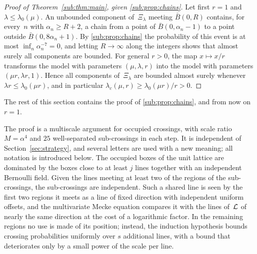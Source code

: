\documentclass[11pt,letterpaper]{article}
\begin{document}
\begin{proof}[Proof of Theorem~\ref{sub:thm:main}, given \cref{sub:prop:chains}]
Let first $r=1$ and $\lambda\le\lambda_0(\mu)$. An unbounded component of~$\Xi_\lambda$ meeting $\bar B(0,R)$ contains, for every~$n$ with $\alpha_n\ge R+2$, a chain from a point of $\bar B(0,\alpha_n-1)$ to a point outside $\bar B(0,8\alpha_n+1)$. By \cref{sub:prop:chains} the probability of this event is at most $\inf_n\alpha_n^{-7}=0$, and letting $R\to\infty$ along the integers shows that almost surely all components are bounded. For general $r>0$, the map $x\mapsto x/r$ transforms the model with parameters $(\mu,\lambda,r)$ into the model with parameters $(\mu r,\lambda r,1)$. Hence all components of~$\Xi_\lambda$ are bounded almost surely whenever $\lambda r\le\lambda_0(\mu r)$, and in particular $\lambda_c(\mu,r)\ge\lambda_0(\mu r)/r>0$.
\end{proof}

The rest of this section contains the proof of \cref{sub:prop:chains}, and from now on $r=1$.

The proof is a multiscale argument for occupied crossings, with scale ratio $M=\alpha^{4}$ and $25$ well-separated sub-crossings in each step. It is independent of Section~\ref{sec:strategy}, and several letters are used with a new meaning; all notation is introduced below. The occupied boxes of the unit lattice are dominated by the boxes close to at least $j$ lines together with an independent Bernoulli field. Given the lines meeting at least two of the regions of the sub-crossings, the sub-crossings are independent. Such a shared line is seen by the first two regions it meets as a line of fixed direction with independent uniform offsets, and the multivariate Mecke equation compares it with the lines of~$\mathcal L$ of nearly the same direction at the cost of a logarithmic factor. In the remaining regions no use is made of its position; instead, the induction hypothesis bounds crossing probabilities uniformly over $s$ additional lines, with a bound that deteriorates only by a small power of the scale per line.
\end{document}
